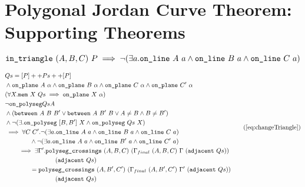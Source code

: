 \label{app:JordanVerificationExtra}
\chapter{Polygonal Jordan Curve Theorem: Supporting Theorems}

\begin{equation}\label{eq:inTriangleNcol}
\texttt{in\_triangle}\ (A,B,C)\ P \implies \neg(\exists a.\texttt{on\_line}\ A\ a\wedge \texttt{on\_line}\ B\ a\wedge \texttt{on\_line}\ C\ a)
\end{equation}

\begin{equation}
\begin{aligned}
    &Qs = \append{[P]}{\append{Ps}{[P]}}\\
    &\wedge \code{on\_plane}\ A\ \alpha \wedge \code{on\_plane}\ B\ \alpha \wedge \code{on\_plane}\ C\ \alpha \wedge \code{on\_plane}\ C'\ \alpha\\
    &(\forall X. \code{mem}\ X\ Qs \implies \code{on\_plane}\ X\ \alpha)\\
    &\neg\code{on\_polyseg} Qs A\\
    &\wedge (\between{A}{B}{B'} \vee \between{A}{B'}{B} \vee A\neq B \wedge B\neq B')\\
    &\wedge \neg(\exists. \code{on\_polyseg}\ [B,B']\ X \wedge \code{on\_polyseg}\ Qs\ X)\\
    &\implies \forall C\;C'. \Triangle{a}{A}{B}{C}\\
    &\qquad\qquad\wedge \Triangle{a}{A}{B'}{C'}\\
    &\qquad\implies \exists \Gamma'. \code{polyseg\_crossings}\ (A,B,C)\ (\Gamma_{final}\ (A,B,C)\ \Gamma\ (\code{adjacent}\ Qs))\\
    &\qquad\qquad\qquad\qquad(\code{adjacent}\ Qs)\\
    &\qquad\qquad = \code{polyseg\_crossings}\ (A,B',C')\ (\Gamma_{final}\ (A,B',C')\ \Gamma'\ (\code{adjacent}\ Qs))\\
    &\qquad\qquad\qquad\qquad(\code{adjacent}\ Qs)\\
\end{aligned}\tag{\ref{eq:changeTriangle}}
\end{equation}

